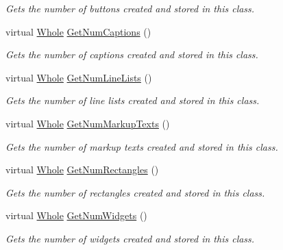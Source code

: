 \begin{DoxyCompactItemize}
\begin{DoxyCompactList}\small\item\em Gets the number of buttons created and stored in this class. \item\end{DoxyCompactList}\item 
virtual \hyperlink{namespaceMezzanine_adcbb6ce6d1eb4379d109e51171e2e493}{Whole} \hyperlink{classMezzanine_1_1UI_1_1Layer_a3aca1c34855d282faef5b5d4c3a5451f}{GetNumCaptions} ()
\begin{DoxyCompactList}\small\item\em Gets the number of captions created and stored in this class. \item\end{DoxyCompactList}\item 
virtual \hyperlink{namespaceMezzanine_adcbb6ce6d1eb4379d109e51171e2e493}{Whole} \hyperlink{classMezzanine_1_1UI_1_1Layer_a4ca051b7cecc316730d0d375becf989f}{GetNumLineLists} ()
\begin{DoxyCompactList}\small\item\em Gets the number of line lists created and stored in this class. \item\end{DoxyCompactList}\item 
virtual \hyperlink{namespaceMezzanine_adcbb6ce6d1eb4379d109e51171e2e493}{Whole} \hyperlink{classMezzanine_1_1UI_1_1Layer_aaa1a666c2c3520a8a39df5c5dea57941}{GetNumMarkupTexts} ()
\begin{DoxyCompactList}\small\item\em Gets the number of markup texts created and stored in this class. \item\end{DoxyCompactList}\item 
virtual \hyperlink{namespaceMezzanine_adcbb6ce6d1eb4379d109e51171e2e493}{Whole} \hyperlink{classMezzanine_1_1UI_1_1Layer_a0832c18bb8c2459c899d14e9fcad8e85}{GetNumRectangles} ()
\begin{DoxyCompactList}\small\item\em Gets the number of rectangles created and stored in this class. \item\end{DoxyCompactList}\item 
virtual \hyperlink{namespaceMezzanine_adcbb6ce6d1eb4379d109e51171e2e493}{Whole} \hyperlink{classMezzanine_1_1UI_1_1Layer_a474f60650b90f1bc2c17dfd8ea5b6304}{GetNumWidgets} ()
\begin{DoxyCompactList}\small\item\em Gets the number of widgets created and stored in this class. \item\end{DoxyCompactList}\item 

\end{DoxyCompactItemize}
